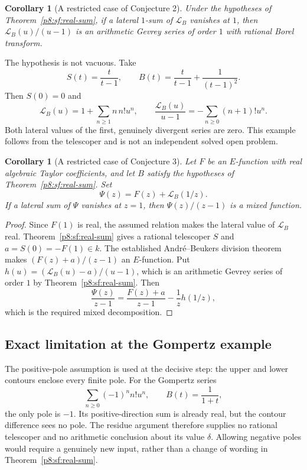 \documentclass[11pt,a4paper]{article}
\newtheorem{corollary}[theorem]{Corollary}
\theoremstyle{definition}
\theoremstyle{remark}
\numberwithin{equation}{section}
\begin{document}
\begin{corollary}[A restricted case of Conjecture 2]
\label{p8:sf:conj2}
Under the hypotheses of Theorem~\ref{p8:sf:real-sum}, if a lateral
$1$-sum of $\mathcal L_B$ vanishes at $1$, then
$\mathcal L_B(u)/(u-1)$ is an arithmetic Gevrey series of order
$1$ with rational Borel transform.
\end{corollary}

The hypothesis is not vacuous. Take
\[
 S(t)=\frac{t}{t-1},\qquad
 B(t)=\frac{t}{t-1}+\frac1{(t-1)^2}.
\]
Then $S(0)=0$ and
\[
 \mathcal L_B(u)=1+\sum_{n\ge1}n\,n!u^n,
 \qquad
 \frac{\mathcal L_B(u)}{u-1}
      =-\sum_{n\ge0}(n+1)!u^n.
\]
Both lateral values of the first, genuinely divergent series are
zero. This example follows from the telescoper and is not an
independent solved open problem.

\begin{corollary}[A restricted case of Conjecture 3]
\label{p8:sf:conj3}
Let $F$ be an $E$-function with real algebraic Taylor coefficients,
and let $B$ satisfy the hypotheses of Theorem~\ref{p8:sf:real-sum}.
Set
\[
 \Psi(z)=F(z)+\mathcal L_B(1/z).
\]
If a lateral sum of $\Psi$ vanishes at $z=1$, then
$\Psi(z)/(z-1)$ is a mixed function.
\end{corollary}
\begin{proof}
Since $F(1)$ is real, the assumed relation makes the lateral value
of $\mathcal L_B$ real. Theorem~\ref{p8:sf:real-sum} gives a rational
telescoper $S$ and $a=S(0)=-F(1)\in k$. The established
Andr\'e--Beukers division theorem makes
$(F(z)+a)/(z-1)$ an $E$-function.
Put $h(u)=(\mathcal L_B(u)-a)/(u-1)$, which is an arithmetic
Gevrey series of order $1$ by Theorem~\ref{p8:sf:real-sum}. Then
\[
 \frac{\Psi(z)}{z-1}
   =\frac{F(z)+a}{z-1}-\frac1z h(1/z),
\]
which is the required mixed decomposition.
\end{proof}

\subsection{Exact limitation at the Gompertz example}
The positive-pole assumption is used at the decisive step: the
upper and lower contours enclose every finite pole. For the
Gompertz series
\[
 \sum_{n\ge0}(-1)^nn!u^n,
 \qquad B(t)=\frac1{1+t},
\]
the only pole is $-1$. Its positive-direction sum is already real,
but the contour difference sees no pole. The residue argument
therefore supplies no rational telescoper and no arithmetic
conclusion about its value $\delta$. Allowing negative poles would
require a genuinely new input, rather than a change of wording in
Theorem~\ref{p8:sf:real-sum}.
\end{document}
